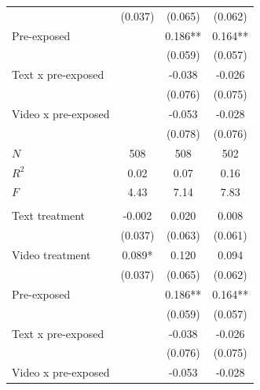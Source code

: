 \documentclass[
  11pt,
  oneside]{article}
\begin{document}
\begin{table}
\begin{threeparttable}
\begin{tabular}[t]{lccc}
\hspace{1em} & (0.037) & (0.065) & \vphantom{1} (0.062)\\
\hspace{1em}Pre-exposed &  & 0.186** & \vphantom{1} 0.164**\\
\hspace{1em} &  & (0.059) & \vphantom{1} (0.057)\\
\hspace{1em}Text x pre-exposed &  & -0.038 & \vphantom{1} -0.026\\
\hspace{1em} &  & (0.076) & \vphantom{1} (0.075)\\
\hspace{1em}Video x pre-exposed &  & -0.053 & \vphantom{1} -0.028\\
\hspace{1em} &  & (0.078) & \vphantom{1} (0.076)\\
\hspace{1em}$N$ & 508 & 508 & \vphantom{1} 502\\
\hspace{1em}$R^2$ & 0.02 & 0.07 & \vphantom{1} 0.16\\
\hspace{1em}$F$ & 4.43 & 7.14 & \vphantom{1} 7.83\\
\addlinespace[0.5em]
\multicolumn{4}{l}{\textit{Outcome: recommend employer}}\\
\midrule \hspace{1em}Text treatment & -0.002 & 0.020 & 0.008\\
\hspace{1em} & (0.037) & (0.063) & (0.061)\\
\hspace{1em}Video treatment & 0.089* & 0.120 & 0.094\\
\hspace{1em} & (0.037) & (0.065) & (0.062)\\
\hspace{1em}Pre-exposed &  & 0.186** & 0.164**\\
\hspace{1em} &  & (0.059) & (0.057)\\
\hspace{1em}Text x pre-exposed &  & -0.038 & -0.026\\
\hspace{1em} &  & (0.076) & (0.075)\\
\hspace{1em}Video x pre-exposed &  & -0.053 & -0.028\\

\end{tabular}
\end{threeparttable}
\end{table}
\end{document}
